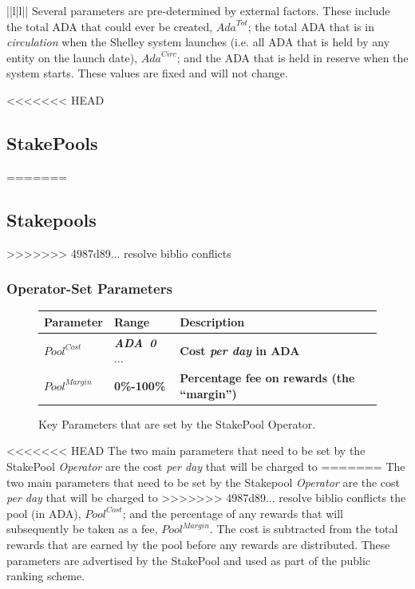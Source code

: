 \documentclass[11pt,a4paper,dvipsnames,twosided,final]{article}
\newcommand{\ada}{ADA{}}
\newcommand{\ADA}[1]{\textbf{\emph{\ada~{#1}}}}
\begin{document}
\begin{tabular}{||l|l||}
\noindent
Several parameters are pre-determined by external factors. These include the
total \ada{} that could ever be created, $\textit{Ada}^{Tot}$;
the total \ada{} that is in \emph{circulation} when the Shelley system launches
(i.e. all \ada{} that is held by any entity on the launch date), $\textit{Ada}^{\textit{Circ}}$;
and the \ada{} that is held in reserve when the system starts.
These values are fixed and will not change.

<<<<<<< HEAD
\subsection{StakePools}
=======
\subsection{Stakepools}
>>>>>>> 4987d89... resolve biblio conflicts

\subsubsection*{Operator-Set Parameters}

\begin{figure}[h!]
\begin{center}
\begin{tabular}{||l|l|p{9cm}||}
  \hline \hline
\textbf{Parameter} & \textbf{Range} & \textbf{Description} \\\hline
       \textbf{\color{red} $\textit{Pool}^{\textit{Cost}}$} &  \textbf{\color{red}  \ADA{0} $\ldots$} & \textbf{\color{red} Cost
         \emph{per day} in \ada{}} \\\hline
\textbf{\color{red} ${\textit{Pool}}^{\textit{Margin}}$} &  \textbf{\color{red} 0\%-100\%} & \textbf{\color{red} Percentage fee on rewards (the ``margin'')} \\\hline
  \hline
\end{tabular}
\end{center}
\caption{Key Parameters that are set by the StakePool Operator.}
\end{figure}

\noindent
<<<<<<< HEAD
The two main parameters that need to be set by the StakePool \emph{Operator} are the cost \emph{per day} that will be charged to
=======
The two main parameters that need to be set by the Stakepool \emph{Operator} are the cost \emph{per day} that will be charged to
>>>>>>> 4987d89... resolve biblio conflicts
the pool (in \ada), $\textit{Pool}^{\textit{Cost}}$; and the percentage of any rewards that will subsequently be taken as a fee, ${\textit{Pool}}^{\textit{Margin}}$.
The cost is subtracted from the total rewards that are earned by the pool before any rewards are distributed.
These parameters are advertised by the StakePool and used as part of the public ranking scheme.


\end{tabular}
\end{document}
